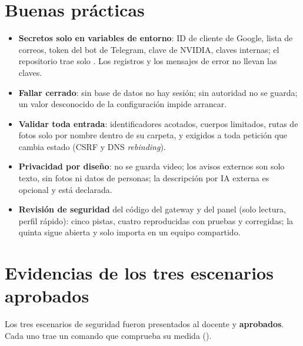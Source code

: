 \section{Buenas prácticas}
\begin{itemize}
  \item \textbf{Secretos solo en variables de entorno}: ID de cliente de Google, lista de correos, token del bot de Telegram, clave de NVIDIA,
  claves internas; el repositorio trae solo . Los registros y los mensajes de error no llevan las claves.
  \item \textbf{Fallar cerrado}: sin base de datos no hay sesión; sin autoridad no se guarda; un valor desconocido de la configuración impide arrancar.
  \item \textbf{Validar toda entrada}: identificadores acotados, cuerpos limitados, rutas de fotos solo por nombre dentro de su carpeta,  y
   exigidos a toda petición que cambia estado (CSRF y DNS \emph{rebinding}).
  \item \textbf{Privacidad por diseño}: no se guarda video; los avisos externos son solo texto, sin fotos ni datos de personas; la descripción por IA
  externa es opcional y está declarada.
  \item \textbf{Revisión de seguridad} del código del gateway y del panel (solo lectura, perfil rápido): cinco pistas, cuatro reproducidas con
  pruebas y corregidas; la quinta sigue abierta y solo importa en un equipo compartido.
\end{itemize}

\section{Evidencias de los tres escenarios aprobados}
Los tres escenarios de seguridad fueron presentados al docente y \textbf{aprobados}. Cada uno trae un comando que comprueba su medida
().

